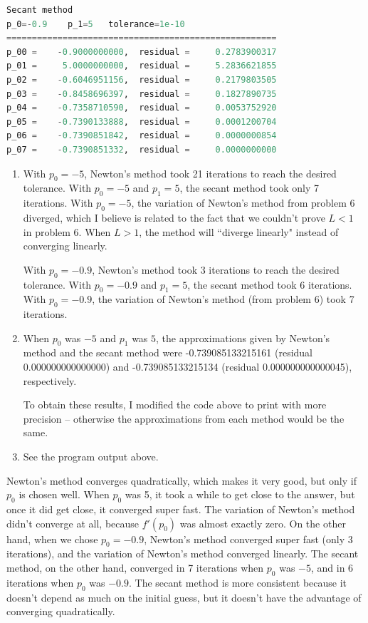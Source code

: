 \documentclass{article}
\begin{document}
\begin{lstlisting}[language=Python]
Secant method
p_0=-0.9	p_1=5	tolerance=1e-10
=====================================================
p_00 =    -0.9000000000,  residual =     0.2783900317
p_01 =     5.0000000000,  residual =     5.2836621855
p_02 =    -0.6046951156,  residual =     0.2179803505
p_03 =    -0.8458696397,  residual =     0.1827890735
p_04 =    -0.7358710590,  residual =     0.0053752920
p_05 =    -0.7390133888,  residual =     0.0001200704
p_06 =    -0.7390851842,  residual =     0.0000000854
p_07 =    -0.7390851332,  residual =     0.0000000000
\end{lstlisting}
\begin{enumerate}[label=(\alph*)]
    \item With $p_0 = -5$, Newton's method took 21 iterations to reach the desired tolerance. With $p_0=-5$ and $p_1=5$, the secant method took only 7 iterations. With $p_0 = -5$, the variation of Newton's method from problem 6 diverged, which I believe is related to the fact that we couldn't prove $L < 1$ in problem 6. When $L > 1$, the method will ``diverge linearly" instead of converging linearly.
        \par
        With $p_0 = -0.9$, Newton's method took 3 iterations to reach the desired tolerance. With $p_0=-0.9$ and $p_1=5$, the secant method took 6 iterations. With $p_0 = -0.9$, the variation of Newton's method (from problem 6) took 7 iterations.
    \item When $p_0$ was $-5$ and $p_1$ was $5$, the approximations given by Newton's method and the secant method were -0.739085133215161 (residual 0.000000000000000) and -0.739085133215134 (residual 0.000000000000045), respectively.
        \par
        To obtain these results, I modified the code above to print with more precision -- otherwise the approximations from each method would be the same.
    \item See the program output above.
\end{enumerate}
Newton's method converges quadratically, which makes it very good, but only if $p_0$ is chosen well. When $p_0$ was 5, it took a while to get close to the answer, but once it did get close, it converged super fast. The variation of Newton's method didn't converge at all, because $f'(p_0)$ was almost exactly zero. On the other hand, when we chose $p_0 = -0.9$, Newton's method converged super fast (only 3 iterations), and the variation of Newton's method converged linearly. The secant method, on the other hand, converged in 7 iterations when $p_0$ was $-5$, and in 6 iterations when $p_0$ was $-0.9$. The secant method is more consistent because it doesn't depend as much on the initial guess, but it doesn't have the advantage of converging quadratically.
\end{document}
